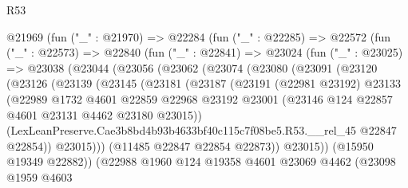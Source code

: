 \begin{lexlean}{R53}
\begin{coremodule}
        @21969
          (fun ("_" : @21970) =>
          @22284
            (fun ("_" : @22285) =>
            @22572
              (fun ("_" : @22573) =>
              @22840
                (fun ("_" : @22841) =>
                @23024
                  (fun ("_" : @23025) =>
                  @23038
                    (@23044
                      (@23056
                        (@23062
                          (@23074
                            (@23080
                              (@23091
                                (@23120
                                  (@23126
                                    (@23139
                                      (@23145
                                        (@23181
                                          (@23187
                                            (@23191
                                              (@22981 @23192)
                                              @23133
                                              (@22989
                                                @1732
                                                @4601
                                                @22859
                                                @22968
                                                @23192
                                                @23001
                                                (@23146
                                                  @124
                                                  @22857
                                                  @4601
                                                  @23131
                                                  @4462
                                                  @23180
                                                  @23015))
                                              (LexLeanPreserve.Cae3b8bd4b93b4633bf40c115c7f08be5.R53.__rel_45
                                                @22847
                                                @22854))
                                            @23015)))
                                      (@11485 @22847 @22854 @22873))
                                    @23015))
                                (@15950 @19349 @22882))
                              (@22988
                                @1960
                                @124
                                @19358
                                @4601
                                @23069
                                @4462
                                (@23098
                                  @1959
                                  @4603

\end{coremodule}
\end{lexlean}
